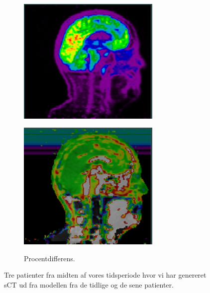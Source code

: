 \begin{figure}
\begin{subfigure}[b]{0.3\textwidth}
        \includegraphics[width=0.75\textwidth]{colager/over_tid_pet/over_tid_210445_late.png}
        \label{col:over_time_pet_pat3_late}
    \end{subfigure}\hfill
    \begin{subfigure}[b]{0.3\textwidth}
        \caption{Procentdifferens.}
        \includegraphics[width=0.75\textwidth]{colager/over_tid_pet/over_tid_210445_pd.png}
        \label{col:over_time_pet_pat3_pd}
    \end{subfigure}
    \caption{Tre patienter fra midten af vores tidsperiode hvor vi har genereret sCT ud fra modellen fra de tidlige og de sene patienter. }
    \label{col:over_time_pet}
\end{figure}
